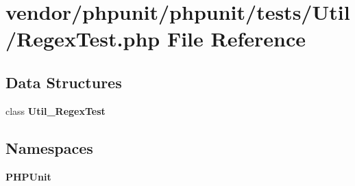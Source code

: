 \section{vendor/phpunit/phpunit/tests/\+Util/\+Regex\+Test.php File Reference}
\label{phpunit_2phpunit_2tests_2_util_2_regex_test_8php}
\subsection*{Data Structures}
\begin{DoxyCompactItemize}
\item 
class {\bf Util\+\_\+\+Regex\+Test}
\end{DoxyCompactItemize}
\subsection*{Namespaces}
\begin{DoxyCompactItemize}
\item 
 {\bf P\+H\+P\+Unit}
\end{DoxyCompactItemize}
